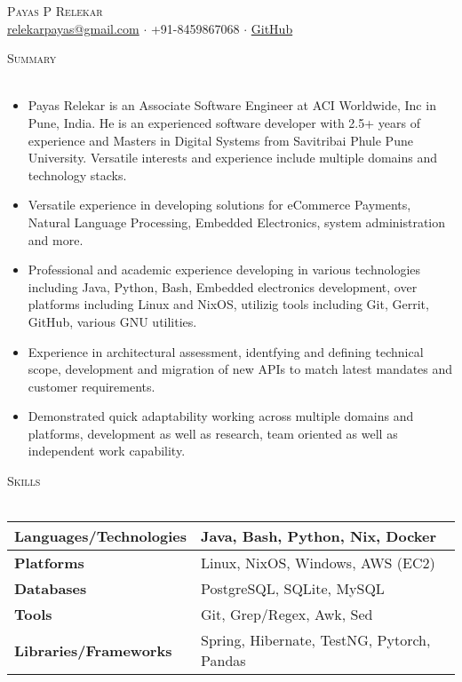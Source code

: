 \documentclass[a4paper]{article}
\newcommand{\lineunder} {
    \vspace*{-8pt} \\
    \hspace*{-18pt} \hrulefill \\
}
\newcommand{\header} [1] {
    {\hspace*{-18pt}\vspace*{6pt} \textsc{#1}}
    \vspace*{-6pt} \lineunder
}
\begin{document}
\vspace*{-40pt}

\vspace*{-10pt}
\begin{center}
	{\Huge \scshape {Payas P Relekar}}\\
	\href{mailto:relekarpayas@gmail.com}{relekarpayas@gmail.com} $\cdot$ +91-8459867068 $\cdot$ \href{https://github.com/remedialchaos/}{GitHub}\\
\end{center}

\header{Summary}
\vspace{1mm}

\begin{itemize} \itemsep 1pt
  \item Payas Relekar is an Associate Software Engineer at ACI Worldwide, Inc in Pune, India. He is an experienced software developer with 2.5+ years of experience and Masters in Digital Systems from Savitribai Phule Pune University. Versatile interests and experience include multiple domains and technology stacks.
  \item Versatile experience in developing solutions for eCommerce Payments, Natural Language Processing, Embedded Electronics, system administration and more.
  \item Professional and academic experience developing in various technologies including Java, Python, Bash, Embedded electronics development, over platforms including Linux and NixOS, utilizig tools including Git, Gerrit, GitHub, various GNU utilities.
  \item Experience in architectural assessment, identfying and defining technical scope, development and migration of new APIs to match latest mandates and customer requirements.
  \item Demonstrated quick adaptability working across multiple domains and platforms, development as well as research, team oriented as well as independent work capability.
\end{itemize}

\header{Skills}
\vspace{1mm}
\bgroup
\setlength{\arrayrulewidth}{0.2mm}
\def\arraystretch{1.2}
\begin{tabularx}{\textwidth}{ | X | X | }
  \hline
	\textbf{Languages/Technologies} & Java, Bash, Python, Nix, Docker        \\
  \hline
	\textbf{Platforms}             & Linux, NixOS, Windows, AWS (EC2)          \\
  \hline
	\textbf{Databases}             & PostgreSQL, SQLite, MySQL             \\
  \hline
	\textbf{Tools}                 & Git, Grep/Regex, Awk, Sed            \\
  \hline
	\textbf{Libraries/Frameworks}  & Spring, Hibernate, TestNG, Pytorch, Pandas \\
  \hline
\end{tabularx}
\egroup
\vspace{2mm}
\end{document}
